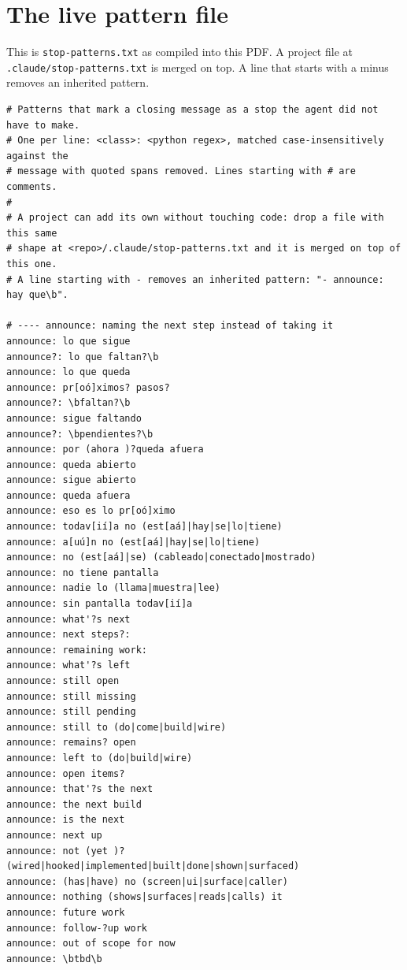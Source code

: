 \section{The live pattern file}
\label{app:patternfile}

This is \texttt{stop-patterns.txt} as compiled into this PDF. A
project file at \texttt{.claude/stop-patterns.txt} is merged on
top. A line that starts with a minus removes an inherited
pattern.

\begin{verbatim}
# Patterns that mark a closing message as a stop the agent did not have to make.
# One per line: <class>: <python regex>, matched case-insensitively against the
# message with quoted spans removed. Lines starting with # are comments.
#
# A project can add its own without touching code: drop a file with this same
# shape at <repo>/.claude/stop-patterns.txt and it is merged on top of this one.
# A line starting with - removes an inherited pattern: "- announce: hay que\b".

# ---- announce: naming the next step instead of taking it
announce: lo que sigue
announce?: lo que faltan?\b
announce: lo que queda
announce: pr[oó]ximos? pasos?
announce?: \bfaltan?\b
announce: sigue faltando
announce?: \bpendientes?\b
announce: por (ahora )?queda afuera
announce: queda abierto
announce: sigue abierto
announce: queda afuera
announce: eso es lo pr[oó]ximo
announce: todav[ií]a no (est[aá]|hay|se|lo|tiene)
announce: a[uú]n no (est[aá]|hay|se|lo|tiene)
announce: no (est[aá]|se) (cableado|conectado|mostrado)
announce: no tiene pantalla
announce: nadie lo (llama|muestra|lee)
announce: sin pantalla todav[ií]a
announce: what'?s next
announce: next steps?:
announce: remaining work:
announce: what'?s left
announce: still open
announce: still missing
announce: still pending
announce: still to (do|come|build|wire)
announce: remains? open
announce: left to (do|build|wire)
announce: open items?
announce: that'?s the next
announce: the next build
announce: is the next
announce: next up
announce: not (yet )?(wired|hooked|implemented|built|done|shown|surfaced)
announce: (has|have) no (screen|ui|surface|caller)
announce: nothing (shows|surfaces|reads|calls) it
announce: future work
announce: follow-?up work
announce: out of scope for now
announce: \btbd\b


\end{verbatim}

